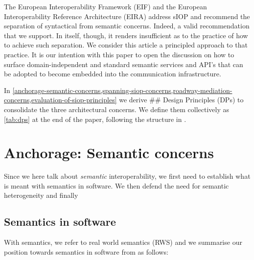 \documentclass[sort&compress,preprint,authoryear,3p,twocolumn]{elsarticle}
\begin{document}
The European Interoperability Framework
(EIF)\citep{EuropeanCommissionDGInformatics-ISA2Programme2017} and the
European Interoperability Reference Architecture (EIRA)
\citep{EuropeanCommissionDGInformatics-ISA2Programme2019} address sIOP
and recommend the separation of syntactical from semantic concerns.
Indeed, a valid recommendation that we support. In itself, though, it
renders insufficient as to the practice of how to achieve such
separation. We consider this article a principled approach to that
practice. It is our intention with this paper to open the discussion on
how to surface domain-independent and standard semantic services and
API's that can be adopted to become embedded into the communication
infrastructure.

In
\cref{anchorage-semantic-concerns,spanning-siop-concerns,roadway-mediation-concerns,evaluation-of-siop-principles}
we derive \#\# Design Principles (DPs) to consolidate the three
architectural concerns. We define them collectively as \cref{tab:dps} at
the end of the paper, following the structure in \citep{Greefhorst2011}.

\hypertarget{anchorage-semantic-concerns}{%
\section{Anchorage: Semantic
concerns}\label{anchorage-semantic-concerns}}

Since we here talk about \emph{semantic} interoperability, we first need
to establish what is meant with semantics in software. We then defend
the need for semantic heterogeneity and finally

\hypertarget{semantics-in-software}{%
\subsection{Semantics in software}\label{semantics-in-software}}

With semantics, we refer to real world semantics (RWS) and we summarise
our position towards semantics in software from \citep{Brandt2021a} as
follows:
\end{document}
